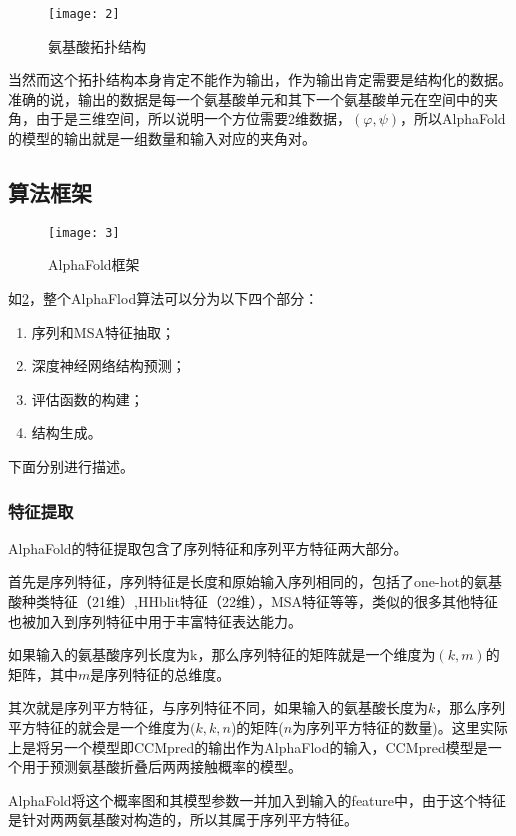 \documentclass[withoutpreface,bwprint]{cumcmthesis}
\begin{document}
\begin{figure}[H]
    \centering
    \texttt{[image: 2]}
    \caption{氨基酸拓扑结构}
    \label{fig:1.2}
\end{figure}

当然而这个拓扑结构本身肯定不能作为输出，作为输出肯定需要是结构化的数据。准确的说，输出的数据是每一个氨基酸单元和其下一个氨基酸单元在空间中的夹角，由于是三维空间，所以说明一个方位需要2维数据，$(\varphi,\psi)$，所以AlphaFold的模型的输出就是一组数量和输入对应的夹角对。

\subsection{算法框架}
\begin{figure}[H]
    \centering
    \texttt{[image: 3]}
    \caption{AlphaFold框架}
    \label{fig:2.1}
\end{figure}

如\cref{fig:2.1}，整个AlphaFlod算法可以分为以下四个部分：

\begin{enumerate}
    \item 序列和MSA特征抽取；
    \item 深度神经网络结构预测；
    \item 评估函数的构建；
    \item 结构生成。
\end{enumerate}

下面分别进行描述。

\subsubsection{特征提取}
AlphaFold的特征提取包含了序列特征和序列平方特征两大部分。

首先是序列特征，序列特征是长度和原始输入序列相同的，包括了one-hot的氨基酸种类特征（21维）,HHblit特征（22维），MSA特征等等，类似的很多其他特征也被加入到序列特征中用于丰富特征表达能力。

如果输入的氨基酸序列长度为k，那么序列特征的矩阵就是一个维度为$(k,m)$的矩阵，其中$m$是序列特征的总维度。

其次就是序列平方特征，与序列特征不同，如果输入的氨基酸长度为$k$，那么序列平方特征的就会是一个维度为$(k,k,n$)的矩阵($n$为序列平方特征的数量)。这里实际上是将另一个模型即CCMpred的输出作为AlphaFlod的输入，CCMpred模型是一个用于预测氨基酸折叠后两两接触概率的模型。

AlphaFold将这个概率图和其模型参数一并加入到输入的feature中，由于这个特征是针对两两氨基酸对构造的，所以其属于序列平方特征。
\end{document}
